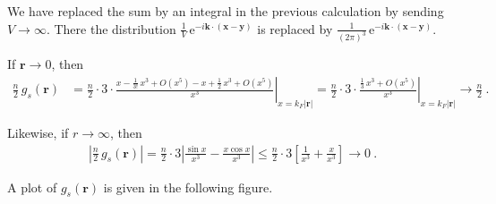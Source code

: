 \documentclass[11pt,a4paper]{article}
\newcommand{\ee}{{\mathrm{e}}}
\newcommand{\abs}[1]{\lvert#1\rvert}
\newcommand{\xabs}[1]{\left\lvert#1\right\rvert}
\newcommand{\boldx}{{\boldsymbol x}}
\newcommand{\boldy}{{\boldsymbol y}}
\newcommand{\boldr}{{\boldsymbol r}}
\newcommand{\boldk}{{\boldsymbol k}}
\begin{document}
\begin{exenumerate}
\begin{loesung}
    We have replaced the sum by an integral in the previous calculation by sending $V\rightarrow\infty$. There
    the distribution
    $\frac{1}{V}\,\ee^{-i\boldk\cdot\left(\boldx-\boldy\right)}$ is replaced by
    $\frac{1}{(2\pi)^3}\,\ee^{-i\boldk\cdot\left(\boldx-\boldy\right)}$.

    If $\boldr\rightarrow 0$, then
    \begin{align}
      \frac{n}{2}\,g_s\left(\boldr\right)
      &= \frac{n}{2}\cdot 3\cdot
      \left.\frac{x - \frac{1}{3!}\,x^3 + O(x^5) - x + \frac12\,x^3 + O(x^5)}{x^3}\right\rvert_{x=k_F\abs\boldr}
      = \frac{n}{2}\cdot 3\cdot\left.\frac{\frac{1}{3}\,x^3 + O(x^5)}{x^3}\right\rvert_{x=k_F\abs\boldr}
      \longrightarrow \frac n 2\ .
    \end{align}

    Likewise, if $r\rightarrow\infty$, then
    \begin{align}
      \xabs{\frac n 2 \, g_s\left(\boldr\right)}
      = \frac n 2 \cdot 3 \xabs{ \frac{\sin x}{x^3} - \frac{x\cos x}{x^3} }
      \leqslant \frac n 2 \cdot 3 \left[ \frac1{x^3} + \frac{x}{x^3} \right] \longrightarrow 0 \ .
    \end{align}

    A plot of $g_s\left(\boldr\right)$ is given in the following figure.
    \begin{center}
      \vspace*{0.2cm} %
    \end{center}


\end{loesung}
\end{exenumerate}
\end{document}
